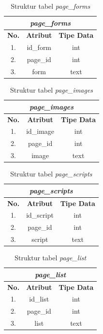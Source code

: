 \begin{table}[h!]
	\centering
	\caption{Struktur tabel \textit{page\_forms}}
	\label{table:entity_page_forms}
	\begin{tabular}{|c|c|c|}
		\hline
		\multicolumn{3}{|c|}{\textit{page\_forms}} \\
		\hline
		\textbf{No.} & \textbf{Atribut} & \textbf{Tipe Data} \\
		\hline
		1. & id\_form & int \\
		2. & page\_id & int \\
		3. & form & text \\
		\hline
	\end{tabular}
\end{table}

\begin{table}[h!]
	\centering
	\caption{Struktur tabel \textit{page\_images}}
	\label{table:entity_page_images}
	\begin{tabular}{|c|c|c|}
		\hline
		\multicolumn{3}{|c|}{\textit{page\_images}} \\
		\hline
		\textbf{No.} & \textbf{Atribut} & \textbf{Tipe Data} \\
		\hline
		1. & id\_image & int \\
		2. & page\_id & int \\
		3. & image & text \\
		\hline
	\end{tabular}
\end{table}

\begin{table}[h!]
	\centering
	\caption{Struktur tabel \textit{page\_scripts}}
	\label{table:entity_page_scripts}
	\begin{tabular}{|c|c|c|}
		\hline
		\multicolumn{3}{|c|}{\textit{page\_scripts}} \\
		\hline
		\textbf{No.} & \textbf{Atribut} & \textbf{Tipe Data} \\
		\hline
		1. & id\_script & int \\
		2. & page\_id & int \\
		3. & script & text \\
		\hline
	\end{tabular}
\end{table}

\begin{table}[h!]
	\centering
	\caption{Struktur tabel \textit{page\_list}}
	\label{table:entity_page_list}
	\begin{tabular}{|c|c|c|}
		\hline
		\multicolumn{3}{|c|}{\textit{page\_list}} \\
		\hline
		\textbf{No.} & \textbf{Atribut} & \textbf{Tipe Data} \\
		\hline
		1. & id\_list & int \\
		2. & page\_id & int \\
		3. & list & text \\
		\hline
	\end{tabular}
\end{table}

